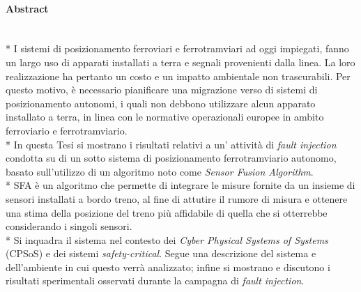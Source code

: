 \paragraph{Abstract}\mbox{}\\*
I sistemi di posizionamento ferroviari e ferrotramviari ad oggi impiegati, fanno un largo uso di apparati installati a terra e segnali provenienti dalla linea. La loro realizzazione ha pertanto un costo e un impatto ambientale non trascurabili. Per questo motivo, \`e necessario pianificare una migrazione verso di sistemi di posizionamento autonomi, i quali non debbono utilizzare alcun apparato installato a terra, in linea con le normative operazionali europee in ambito ferroviario e ferrotramviario.\\*
In questa Tesi si mostrano i risultati relativi a un' attivit\`a di \emph{fault injection} condotta su di un sotto sistema di posizionamento ferrotramviario autonomo, basato sull'utilizzo di un algoritmo noto come \emph{Sensor Fusion Algorithm}.\\*
SFA \`e un algoritmo che permette di integrare le misure fornite da un insieme di sensori installati a bordo treno, al fine di attutire il rumore di misura e ottenere una stima della posizione del treno pi\`u affidabile di quella che si otterrebbe considerando i singoli sensori.\\*
Si inquadra il sistema nel contesto dei \emph{Cyber Physical Systems of Systems} (CPSoS) e dei sistemi \emph{safety-critical}. Segue una descrizione del sistema e dell'ambiente in cui questo verr\`a analizzato; infine si mostrano e discutono i risultati sperimentali osservati durante la campagna di \emph{fault injection}.

